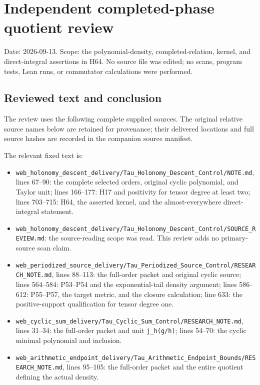 \section{Independent completed-phase quotient review}\label{independent-completed-phase-quotient-review}

Date: 2026-09-13. Scope: the polynomial-density, completed-relation, kernel, and direct-integral assertions in H64. No source file was edited; no scans, program tests, Lean runs, or commutator calculations were performed.

\subsection{Reviewed text and conclusion}\label{reviewed-text-and-conclusion}

The review uses the following complete supplied sources. The original relative source names below are retained for provenance; their delivered locations and full source hashes are recorded in the companion source manifest.

The relevant fixed text is:

\begin{itemize}
\tightlist
\item
  \texttt{web\_holonomy\_descent\_delivery/Tau\_Holonomy\_Descent\_Control/NOTE.md}, lines 67--90: the complete selected orders, original cyclic polynomial, and Taylor unit; lines 166--177: H17 and positivity for tensor degree at least two; lines 703--715: H64, the asserted kernel, and the almost-everywhere direct-integral statement.
\item
  \texttt{web\_holonomy\_descent\_delivery/Tau\_Holonomy\_Descent\_Control/SOURCE\_REVIEW.md}: the source-reading scope was read. This review adds no primary-source scan claim.
\item
  \texttt{web\_periodized\_source\_delivery/Tau\_Periodized\_Source\_Control/RESEARCH\_NOTE.md}, lines 88--113: the full-order packet and original cyclic source; lines 564--584: P53--P54 and the exponential-tail density argument; lines 586--612: P55--P57, the target metric, and the closure calculation; line 633: the positive-support qualification for tensor degree one.
\item
  \texttt{web\_cyclic\_sum\_delivery/Tau\_Cyclic\_Sum\_Control/RESEARCH\_NOTE.md}, lines 31--34: the full-order packet and unit \texttt{j\_h(g/h)}; lines 54--70: the cyclic minimal polynomial and inclusion.
\item
  \texttt{web\_arithmetic\_endpoint\_delivery/Tau\_Arithmetic\_Endpoint\_Bounds/RESEARCH\_NOTE.md}, lines 95--105: the full-order packet and the entire quotient defining the actual density.
\end{itemize}

